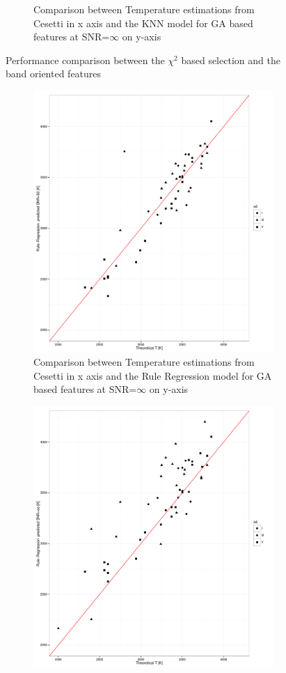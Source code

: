 \begin {figure}
\begin{subfigure}{.85\textwidth}
  \caption{Comparison between Temperature estimations from Cesetti 
 in x axis and the KNN model for GA based features 
 at SNR=$\infty$ on y-axis}
 \label{fig:ga_too50ga_spt}
 \end{subfigure}
 \label {fig:comp01}
 \caption{Performance comparison between the $\chi^2$ based selection 
          and the band oriented features}
\end {figure}
 
 
\begin {figure}
 \centering 
 \begin{subfigure}{.85\textwidth}
  \centering
  \includegraphics[width=11cm]{figs/irtf_T_rregoo_Cesetti.pdf}
  \caption{Comparison between Temperature estimations from Cesetti 
 in x axis and the Rule Regression model for GA based features 
 at SNR=$\infty$ on y-axis}
 \label{fig:ga_rr00ga_spt}
 \end{subfigure}
\begin{subfigure}{.85\textwidth}
  \centering
  \includegraphics[width=11cm]{figs/irtf_T_rreg50_Cesetti.pdf}

\end{subfigure}
\end{figure}
